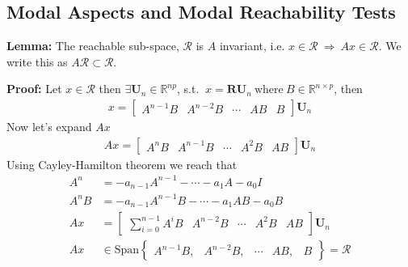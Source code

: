 \documentclass[twoside]{article}
\begin{document}
\subsection{Modal Aspects and Modal Reachability Tests}

\textbf{Lemma:} The reachable sub-space, $\mathcal{R}$ is $A$ invariant, i.e. $x\in \mathcal{R} \ \Rightarrow \ A x \in \mathcal{R}$. We 
write this as $A \mathcal{R} \subset \mathcal{R}$.

\textbf{Proof:} Let $x \in \mathcal{R}$ then $\exists \textbf{U}_n \in \mathbb{R}^{n p}$, s.t. $\ x = \mathbf{R} \textbf{U}_n 
 \ \mathrm{where} \ B \in \mathbb{R}^{n \times p}$, then
%
\begin{align*}
 x = \left[ \begin{array}{c|c|c|c|c} A^{n-1} B & A^{n-2} B &
         \cdots & A B & B \end{array} \right] \textbf{U}_n 
\end{align*}
%
Now let's expand $A x$
%
\begin{align*}
 A x = \left[ \begin{array}{c|c|c|c|c} A^{n} B & A^{n-1} B &
         \cdots & A^2 B & A B \end{array} \right] \textbf{U}_n 
\end{align*}
%
Using Cayley-Hamilton theorem we reach that
%
%
\begin{align*}
 A^n &= -a_{n-1} A^{n-1} - \cdots - a_1 A - a_0 I
 \\
 A^n B &= -a_{n-1} A^{n-1} B - \cdots - a_1 A B - a_0 B
 \\
 A x &= \left[ \begin{array}{c|c|c|c|c} \sum\limits_{i=0}^{n-1} A^{i} B & A^{n-2} B &
         \cdots & A^2 B & A B \end{array} \right] \textbf{U}_n 
 \\
 A x &\in \mathrm{Span} \left\lbrace \begin{array}{ccccc} A^{n-1} B , & A^{n-2} B , &
         \cdots & A B , & B \end{array} \right\rbrace = \mathcal{R}
\end{align*}
%
%

\end{document}
